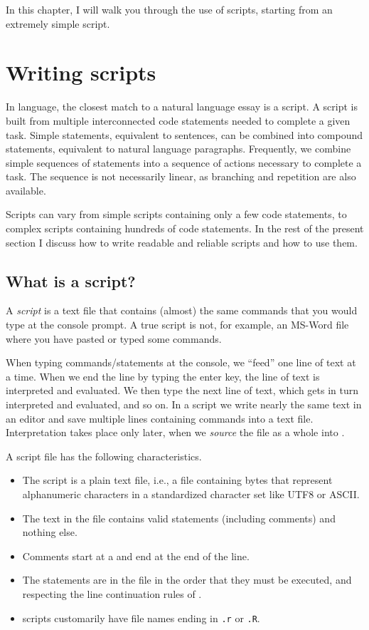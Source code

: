 In this chapter, I will walk you through the use of \Rpgrm scripts, starting from an extremely simple script.

\section{Writing scripts}

In \Rlang language, the closest match to a natural language essay is a script. A script is built from multiple interconnected code statements needed to complete a given task. Simple statements, equivalent to sentences, can be combined into compound statements, equivalent to natural language paragraphs. Frequently, we combine simple sequences of statements into a sequence of actions necessary to complete a task. The sequence is not necessarily linear, as branching and repetition are also available.

Scripts can vary from simple scripts containing only a few code statements, to complex scripts containing hundreds of code statements. In the rest of the present section I discuss how to write readable and reliable scripts and how to use them.

\subsection{What is a script?}\label{sec:script:what:is}
A \textit{script} is a text file that contains (almost) the same commands that you would type at the \Rlang console prompt. A true script is not, for example, an MS-Word file where you have pasted or typed some \Rlang commands.

When typing commands/statements at the \Rlang console, we ``feed'' one line of text at a time. When we end the line by typing the enter key, the line of text is interpreted and evaluated. We then type the next line of text, which gets in turn interpreted and evaluated, and so on. In a script we write nearly the same text in an editor and save multiple lines containing commands into a text file. Interpretation takes place only later, when we \emph{source} the file as a whole into \Rlang.

A script file has the following characteristics.
\begin{itemize}
  \item The script is a plain text file, i.e., a file containing bytes that represent alphanumeric characters in a standardized character set like UTF8 or ASCII.
  \item The text in the file contains valid \Rlang statements (including comments) and nothing else.
  \item Comments start at a \code{\#} and end at the end of the line.
  \item The \Rlang statements are in the file in the order that they must be executed, and respecting the line continuation rules of \Rlang.
  \item \Rlang scripts customarily have file names ending in \texttt{.r} or \texttt{.R}.
\end{itemize}

